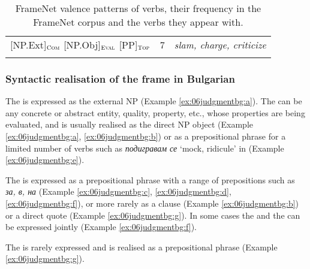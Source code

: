 \documentclass[output=paper,colorlinks,citecolor=brown]{langscibook}
\begin{document}
\begin{table}
\begin{tabularx}{\textwidth}{ lrQ }

{[NP.Ext]}$_{\text{\textsc{Com}}}$ {[NP.Obj]}$_{\text{\textsc{Eval}}}$ {[PP]}$_{\text{\textsc{Top}}}$  & 7 & \textit{slam, charge, criticize}\\
\lspbottomrule
    \end{tabularx}
    \caption{FrameNet valence patterns of  verbs, their frequency in the FrameNet corpus and the verbs they appear with.}
    \label{tbl:judgment-valence}
\end{table} 
 

\subsubsection{Syntactic realisation of the frame  in Bulgarian}


The  is expressed as the external NP (Example \ref{ex:06judgmentbg:a}). The  can be any concrete or abstract entity, quality, property, etc., whose properties are being evaluated, and is usually realised as the direct NP object (Example \ref{ex:06judgmentbg:a}, \ref{ex:06judgmentbg:b}) or as a prepositional phrase for a limited number of verbs such as \textit{подигравам се} `mock, ridicule' in (Example \ref{ex:06judgmentbg:e}). 

The  is expressed as a prepositional phrase with a range of prepositions such as \textit{за, в, на} (Example \ref{ex:06judgmentbg:c}, \ref{ex:06judgmentbg:d}, \ref{ex:06judgmentbg:f}), or more rarely as a clause (Example \ref{ex:06judgmentbg:b}) or a direct quote (Example \ref{ex:06judgmentbg:g}). In some cases the  and the  can be expressed jointly (Example \ref{ex:06judgmentbg:f}).%

The  is rarely expressed and is realised as a prepositional phrase (Example \ref{ex:06judgmentbg:g}).
\end{document}
